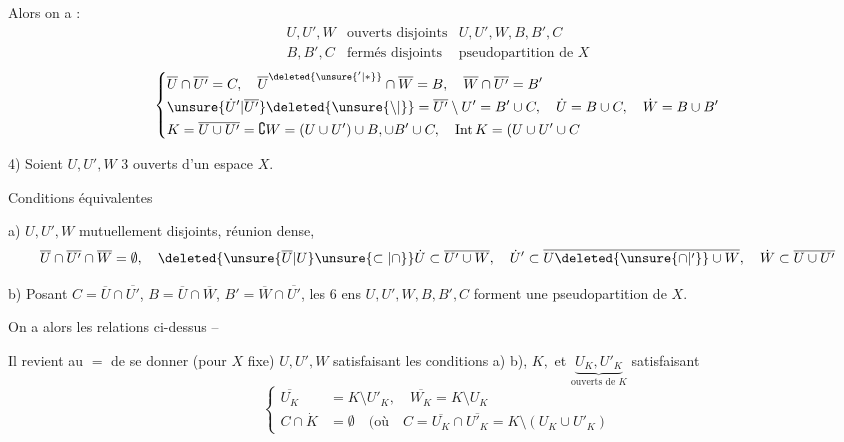 Alors on a :
\[
\begin{array}{ll|l}
 U,U',W&\text{ouverts disjoints}& U,U',W,B,B',C\\
 B,B',C&\text{fermés disjoints}&\text{pseudopartition de }X
\end{array}
\]
\[
\left\{\begin{aligned}
 &\overline U\cap\overline{U'}=C,\quad
 \overline U^{\deleted{\unsure{'|*}}}\cap\overline W=B,\quad
 \overline W\cap\overline{U'}=B'\\
 &\unsure{\dot U'|\overline{U'}}\deleted{\unsure{\setminus|{}}}=\overline{U'}\setminus U'=B'\cup C,\quad
 \dot U=B\cup C,\quad \dot W=B\cup B'\\
 &K=\overline{U\cup U'}=\complement W=(U\cup U')\cup B,\cup B'\cup C,\quad
 \mathrm{Int}\,K=(U\cup U'\cup C
\end{aligned}\right.
\]

4)  Soient $U,U',W$ 3 ouverts d'un espace $X$.

Conditions équivalentes

a) $U,U',W$ mutuellement disjoints, réunion dense,
\[
 \overline U\cap\overline{U'}\cap\overline W=\emptyset,\quad
 \deleted{\unsure{\overline U|U}\unsure{\subset|\cap}}\dot U\subset\overline{U'\cup W},\quad
 \dot U'\subset\overline{U\deleted{\unsure{\cap|'}}\cup W},\quad
 \dot W\subset\overline{U\cup U'}
\]

b) Posant $C=\overline U\cap\overline{U'}$, $B=\overline U\cap\overline W$, $B'=\overline W\cap\overline{U'}$, les 6 ens $U,U',W,B,B',C$ forment une pseudopartition de $X$.

On a alors les relations ci-dessus --

Il revient au $=$ de se donner (pour $X$ fixe) $U,U',W$ satisfaisant les conditions  a) b),  $K,$  et $\underbrace{U_K,U'_K}_{\text{ouverts de }K}$ satisfaisant
\[
\left\{\begin{aligned}
 \overline{U_K}&=K\setminus U'_K,\quad \overline{W_K}=K\setminus U_K\\
 C\cap\dot K&=\emptyset\quad \text{(où}\quad C=\overline{U_K}\cap\overline{U'_K}=K\setminus(U_K\cup U'_K)
\end{aligned}\right.
\]

